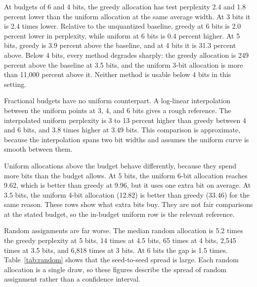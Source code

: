 \documentclass[11pt]{article}
\begin{document}
\begin{table}[t]
\centering
\caption{Test perplexity by budget. Greedy uses the average width shown. Uniform uses the widths below and above the budget; the above row is omitted when the budget equals a width, since it is then the same allocation. The unquantized test perplexity is 9.58.}
\label{tab:main}

\end{table}

At budgets of 6 and 4 bits, the greedy allocation has test perplexity 2.4 and 1.8 percent lower than the uniform allocation at the same average width. At 3 bits it is 2.4 times lower. Relative to the unquantized baseline, greedy at 6 bits is 2.0 percent lower in perplexity, while uniform at 6 bits is 0.4 percent higher. At 5 bits, greedy is 3.9 percent above the baseline, and at 4 bits it is 31.3 percent above. Below 4 bits, every method degrades sharply: the greedy allocation is 249 percent above the baseline at 3.5 bits, and the uniform 3-bit allocation is more than 11{,}000 percent above it. Neither method is usable below 4 bits in this setting.

Fractional budgets have no uniform counterpart. A log-linear interpolation between the uniform points at 3, 4, and 6 bits gives a rough reference. The interpolated uniform perplexity is 3 to 13 percent higher than greedy between 4 and 6 bits, and 3.8 times higher at 3.49 bits. This comparison is approximate, because the interpolation spans two bit widths and assumes the uniform curve is smooth between them.

Uniform allocations above the budget behave differently, because they spend more bits than the budget allows. At 5 bits, the uniform 6-bit allocation reaches 9.62, which is better than greedy at 9.96, but it uses one extra bit on average. At 3.5 bits, the uniform 4-bit allocation (12.82) is better than greedy (33.46) for the same reason. These rows show what extra bits buy. They are not fair comparisons at the stated budget, so the in-budget uniform row is the relevant reference.

Random assignments are far worse. The median random allocation is 5.2 times the greedy perplexity at 5 bits, 14 times at 4.5 bits, 65 times at 4 bits, 2{,}545 times at 3.5 bits, and 6{,}818 times at 3 bits. At 6 bits the gap is 1.5 times. Table~\ref{tab:random} shows that the seed-to-seed spread is large. Each random allocation is a single draw, so these figures describe the spread of random assignment rather than a confidence interval.
\end{document}
